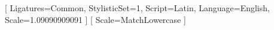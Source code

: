 
\usepackage[usenames,dvipsnames]{xcolor}
\newcommand\myshade{85}


\usepackage[nottoc,notlot,notlof]{tocbibind}

\usepackage{amsmath}








\usepackage[quiet]{fontspec}

\usepackage{unicode-math}
\setmainfont{Hoefler Text Pro}[
  Ligatures={Common},
  StylisticSet=1, %
  Script=Latin,
  Language=English,
  Scale=1.09090909091 %
]
\setmonofont{Monego}[
  Scale=MatchLowercase
]

\usepackage{scalefnt,letltxmacro}
\LetLtxMacro{\oldtextsc}{\textsc}
\renewcommand{\textsc}[1]{\oldtextsc{\scalefont{1.10}#1}}

